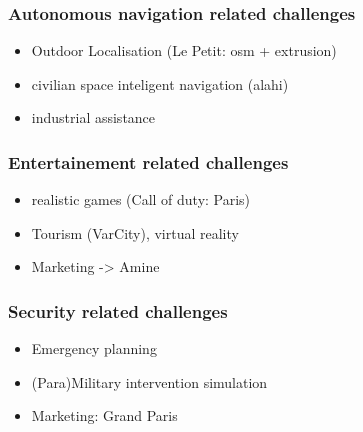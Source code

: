         \subsubsection{Autonomous navigation related challenges}
        \begin{itemize}
            \item Outdoor Localisation (Le Petit: osm + extrusion)
            \item civilian space inteligent navigation (alahi)
            \item industrial assistance
        \end{itemize}
        \subsubsection{Entertainement related challenges}
        \begin{itemize}
            \item realistic games (Call of duty: Paris)
            \item Tourism (VarCity), virtual reality
            \item Marketing -> Amine
        \end{itemize}
        \subsubsection{Security related challenges}
        \begin{itemize}
            \item Emergency planning
            \item (Para)Military intervention simulation
            \item Marketing: Grand Paris
        \end{itemize}
